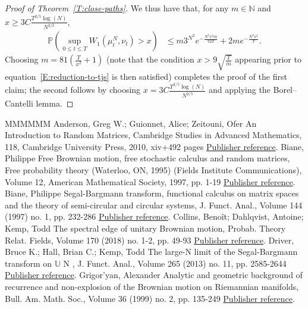 \documentclass[11pt]{article}
\theoremstyle{definition}
\numberwithin{equation}{section}
\numberwithin{figure}{section}
\numberwithin{table}{section}
\newcommand{\Prob}{\mathbb{P}}
\begin{document}
\begin{proof}[Proof of Theorem~\ref{T:close-paths}]
We thus have that, for any $m\in\mathbb{N}$ and $x\ge 3C\frac{T^{2/5}\log(N)}{N^{2/5}}$,
\begin{align*}
\Prob\left(\sup_{0\le t\le
T}W_1(\mu^N_t,\nu_t)>x\right)&
\le m3^{N^2}e^{-\frac{N^2x^2m}{72T}}+2me^{-\frac{N^2x^2}{T}}.
\end{align*}
Choosing $m=81\left(\frac{T}{x^2}+1\right)$ (note that the condition $x>9\sqrt{\frac{T}{m}}$ appearing prior to equation~\ref{E:reduction-to-tjs} is then satisfied) completes the proof of the first claim; the second follows by choosing $x=3C\frac{T^{2/5}\log(N)}{N^{2/5}}$ and applying the Borel--Cantelli lemma.
\end{proof}




\begin{thebibliography}{MMMMMM}
 Anderson, Greg W.; Guionnet, Alice; Zeitouni, Ofer An Introduction to Random Matrices, Cambridge Studies in Advanced Mathematics, 118, Cambridge University Press, 2010, xiv+492 pages \href{https://ahl.centre-mersenne.org/item/AHL_2018__1__247_0/#AGZ}{Publisher reference}.
 Biane, Philippe Free Brownian motion, free stochastic calculus and random matrices, Free probability theory (Waterloo, ON, 1995) (Fields Institute Communications), Volume 12, American Mathematical Society, 1997, pp. 1-19 \href{https://ahl.centre-mersenne.org/item/AHL_2018__1__247_0/#Biane1997}{Publisher reference}.
 Biane, Philippe Segal-Bargmann transform, functional calculus on matrix spaces and the theory of semi-circular and circular systems, J. Funct. Anal., Volume 144 (1997) no. 1, pp. 232-286 \href{https://ahl.centre-mersenne.org/item/AHL_2018__1__247_0/#Biane1997-2}{Publisher reference}.
 Collins, Benoît; Dahlqvist, Antoine; Kemp, Todd The spectral edge of unitary Brownian motion, Probab. Theory Relat. Fields, Volume 170 (2018) no. 1-2, pp. 49-93 \href{https://ahl.centre-mersenne.org/item/AHL_2018__1__247_0/#CDK2016}{Publisher reference}.
 Driver, Bruce K.; Hall, Brian C.; Kemp, Todd The large-N limit of the Segal-Bargmann transform on \ensuremath{\mathbb{U}} N , J. Funct. Anal., Volume 265 (2013) no. 11, pp. 2585-2644 \href{https://ahl.centre-mersenne.org/item/AHL_2018__1__247_0/#DHK2013}{Publisher reference}.
 Grigor’yan, Alexander Analytic and geometric background of recurrence and non-explosion of the Brownian motion on Riemannian manifolds, Bull. Am. Math. Soc., Volume 36 (1999) no. 2, pp. 135-249 \href{https://ahl.centre-mersenne.org/item/AHL_2018__1__247_0/#Grigoryan1999}{Publisher reference}.

\end{thebibliography}
\end{document}
